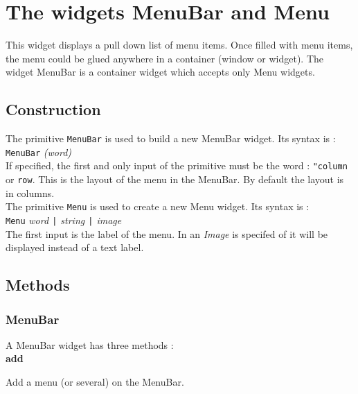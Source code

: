 \section{The widgets MenuBar and Menu}

This widget displays a pull down list of menu items. Once filled with menu items, the menu could be glued anywhere in a container (window or widget). The widget MenuBar is a container widget which accepts only Menu widgets.

\subsection{Construction}

The primitive {\tt MenuBar} is used to build a new MenuBar widget. Its syntax is :\\

{\tt MenuBar} {\it (word)}\\

If specified, the first and only input of the primitive must be the word : {\tt "column} or {\tt row}. This is the layout of the menu in the MenuBar. By default the layout is in columns.\\

The primitive {\tt Menu} is used to create a new Menu widget. Its syntax is :\\

\cbstart
{\tt Menu} {\it word \verb?|? string \verb?|? image}\\

The first input is the label of the menu. In an {\it Image} is specifed of it will be displayed instead of a text label. 
\cbend

\subsection{Methods}

\subsubsection{MenuBar}

A MenuBar widget has three methods :\\

{\bf add} 
Add a menu (or several) on the MenuBar.\\

